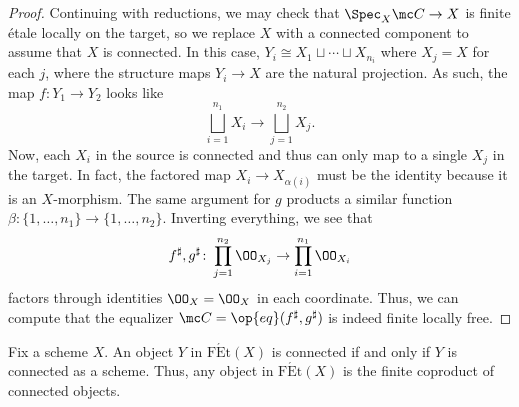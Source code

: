 \documentclass{amsart}
\begin{document}
\begin{proof}
    Continuing with reductions, we may check that $\Spec_X\mc C\to X$ is finite \'etale locally on the target, so we replace $X$ with a connected component to assume that $X$ is connected. In this case, $Y_i\cong X_1\sqcup\cdots\sqcup X_{n_i}$ where $X_j=X$ for each $j$, where the structure maps $Y_i\to X$ are the natural projection. As such, the map $f\colon Y_1\to Y_2$ looks like
    \[\bigsqcup_{i=1}^{n_1}X_i\to\bigsqcup_{j=1}^{n_2}X_j.\]
    Now, each $X_i$ in the source is connected and thus can only map to a single $X_j$ in the target. In fact, the factored map $X_i\to X_{\alpha(i)}$ must be the identity because it is an $X$-morphism. The same argument for $g$ products a similar function $\beta\colon\{1,\ldots,n_1\}\to\{1,\ldots,n_2\}$. Inverting everything, we see that
    \[f^\sharp,g^\sharp\colon\prod_{j=1}^{n_2}\OO_{X_j}\to\prod_{i=1}^{n_1}\OO_{X_i}\]
    factors through identities $\OO_X=\OO_X$ in each coordinate. Thus, we can compute that the equalizer $\mc C=\op{eq}(f^\sharp,g^\sharp)$ is indeed finite locally free.
\end{proof}
\begin{lemma} \label{lem:fin-et-connected}
    Fix a scheme $X$. An object $Y$ in $\mathrm{F\acute Et}(X)$ is connected if and only if $Y$ is connected as a scheme. Thus, any object in $\mathrm{F\acute Et}(X)$ is the finite coproduct of connected objects.
\end{lemma}
\end{document}
